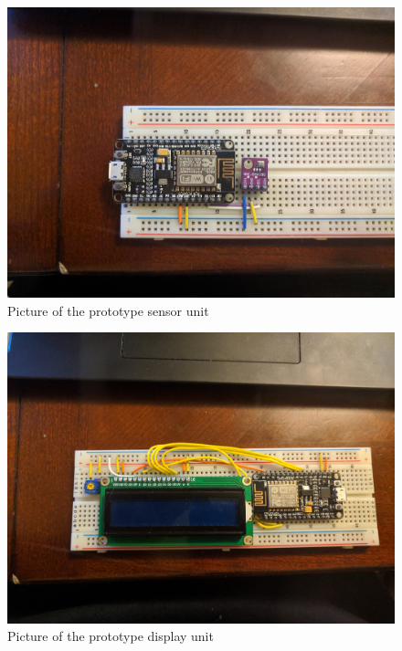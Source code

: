 \documentclass[onecolumn, 12pt]{IEEEConf}
\begin{document}
        \begin{figure}
            \centering
            \includegraphics[max width=\textwidth,keepaspectratio,scale=.5]{images/ServerPhoto.jpg}
            \caption{\label{fig:SensorPhoto}Picture of the prototype sensor unit}
        \end{figure} 

        \begin{figure}
            \centering
            \includegraphics[max width=\textwidth,keepaspectratio,scale=.5]{images/ClientPhoto.jpg}
            \caption{\label{fig:DisplayPhoto}Picture of the prototype display unit}
        \end{figure}
\end{document}
